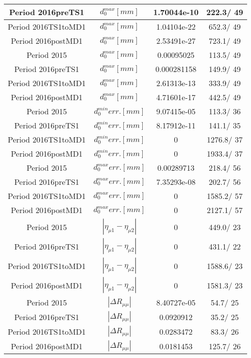 \documentclass{article}
\begin{document}
\begin{longtable}{c|c|c|c}
\hline
 Period 2016preTS1 & $d_{0}^{max} [mm]$ & 1.70044e-10 & 222.3/ 49\\
\hline
 Period 2016TS1toMD1 & $d_{0}^{max} [mm]$ & 1.04104e-22 & 652.3/ 49\\
\hline
 Period 2016postMD1 & $d_{0}^{max} [mm]$ & 2.53491e-27 & 723.1/ 49\\
\hline
 Period 2015 & $d_{0}^{max} [mm]$ & 0.00095025 & 113.5/ 49\\
\hline
 Period 2016preTS1 & $d_{0}^{max} [mm]$ & 0.000281158 & 149.9/ 49\\
\hline
 Period 2016TS1toMD1 & $d_{0}^{max} [mm]$ & 2.61313e-13 & 333.9/ 49\\
\hline
 Period 2016postMD1 & $d_{0}^{max} [mm]$ & 4.71601e-17 & 442.5/ 49\\
\hline
 Period 2015 & $d_{0}^{min} err. [mm]$ & 9.07415e-05 & 113.3/ 36\\
\hline
 Period 2016preTS1 & $d_{0}^{min} err. [mm]$ & 8.17912e-11 & 141.1/ 35\\
\hline
 Period 2016TS1toMD1 & $d_{0}^{min} err. [mm]$ & 0 & 1276.8/ 37\\
\hline
 Period 2016postMD1 & $d_{0}^{min} err. [mm]$ & 0 & 1933.4/ 37\\
\hline
 Period 2015 & $d_{0}^{max} err. [mm]$ & 0.00289713 & 218.4/ 56\\
\hline
 Period 2016preTS1 & $d_{0}^{max} err. [mm]$ & 7.35293e-08 & 202.7/ 56\\
\hline
 Period 2016TS1toMD1 & $d_{0}^{max} err. [mm]$ & 0 & 1585.2/ 57\\
\hline
 Period 2016postMD1 & $d_{0}^{max} err. [mm]$ & 0 & 2127.1/ 57\\
\hline
 Period 2015 & $|\eta_{\mu1}-\eta_{\mu2}|$ & 0 & 449.0/ 23\\
\hline
 Period 2016preTS1 & $|\eta_{\mu1}-\eta_{\mu2}|$ & 0 & 431.1/ 22\\
\hline
 Period 2016TS1toMD1 & $|\eta_{\mu1}-\eta_{\mu2}|$ & 0 & 1588.6/ 23\\
\hline
 Period 2016postMD1 & $|\eta_{\mu1}-\eta_{\mu2}|$ & 0 & 1581.3/ 23\\
\hline
 Period 2015 & $|\Delta R_{\mu \mu}|$ & 8.40727e-05 &  54.7/ 25\\
\hline
 Period 2016preTS1 & $|\Delta R_{\mu \mu}|$ & 0.0920912 &  35.2/ 25\\
\hline
 Period 2016TS1toMD1 & $|\Delta R_{\mu \mu}|$ & 0.0283472 &  83.3/ 26\\
\hline
 Period 2016postMD1 & $|\Delta R_{\mu \mu}|$ & 0.0181453 & 125.7/ 26\\

\end{longtable}
\end{document}
